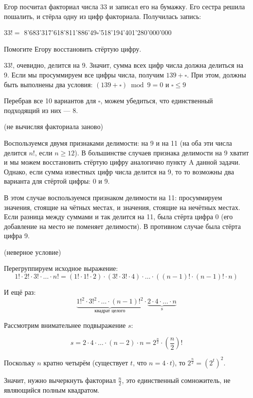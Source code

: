 \begin{itemize}
\itA Егор посчитал факториал числа 33 и записал его на бумажку. 
Его сестра решила пошалить, и стёрла одну из цифр факториала. Получилась запись: \smallskip \\
\centerline{$33!=$ 8'683'317'618'811'886'49$\square$'518'194'401'280'000'000} \smallskip
Помогите Егору восстановить стёртую цифру.

$33!$, очевидно, делится на 9. Значит, сумма всех цифр числа должна делиться на 9.
Если мы просуммируем все цифры числа, получим $139+\square$. При этом, должны быть выполнены
два условия: 
$(139+\square) \bmod 9 = 0$ и $\square \le 9$

Перебрав все 10 вариантов
для $\square$, можем убедиться, что единственный подходящий из них --- 8.

\itB (не вычисляя факториала заново)

Воспользуемся двумя признаками делимости: на 9 и на 11 (на оба эти числа делится $n!$, если $n \ge 12$).
В большинстве случаев признака делимости на 9 хватит и мы можем восстановить стёртую цифру аналогично
пункту A данной задачи. Однако, если сумма известных цифр числа делится на 9, то
то возможны два варианта для стёртой цифры: 0 и 9.

В этом случае воспользуемся признаком делимости на 11: просуммируем значения, стоящие на чётных местах,
и значения, стоящие на нечётных местах. Если разница между суммами и так делится на 11, была стёрта цифра 0
(его добавление на место не поменяет делимости). В противном случае была стёрта цифра 9.

\itC (неверное условие)

Перегруппируем исходное выражение:
$$1! \cdot 2! \cdot 3! \cdot \ldots \cdot n! = (1! \cdot 1! \cdot 2) \cdot (3! \cdot 3! \cdot 4) \cdot \ldots \cdot ((n-1)! \cdot (n-1)! \cdot n)$$

И ещё раз:
$$\underbrace{1!^2 \cdot 3!^2 \cdot \ldots \cdot (n-1)!^2}_\textrm{квадрат целого} \cdot \underbrace{2 \cdot 4 \cdot \ldots \cdot n}_\textrm{s}$$

Рассмотрим внимательнее подвыражение $s$:

$$s = 2 \cdot 4 \cdot \ldots \cdot (n-2) \cdot n = 2^{\frac{n}{2}} \cdot \left(\frac{n}{2}\right)!$$

Поскольку $n$ кратно четырём (существует $t$, что $n = 4\cdot t$), то 
$2^{\frac{n}{2}} = (2^t)^2$.

Значит, нужно вычеркнуть факториал $\frac{n}{2}$, это единственный сомножитель, не являющийся полным квадратом.

\end{itemize}

